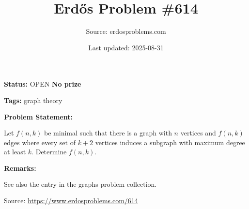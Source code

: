 \documentclass{article}
\title{Erd\H{o}s Problem \#614}
\date{Last updated: 2025-08-31}
\author{Source: erdosproblems.com}
\begin{document}
\maketitle

\noindent\textbf{Status:} OPEN \quad \textbf{No prize}

\noindent\textbf{Tags:} graph theory

\medskip
\noindent\textbf{Problem Statement:}

Let $f(n,k)$ be minimal such that there is a graph with $n$ vertices and $f(n,k)$ edges where every set of $k+2$ vertices induces a subgraph with maximum degree at least $k$. Determine $f(n,k)$.

\bigskip
\noindent\textbf{Remarks:}

See also the entry in the graphs problem collection.

\bigskip
\noindent\small{Source: \url{https://www.erdosproblems.com/614}}
\end{document}
